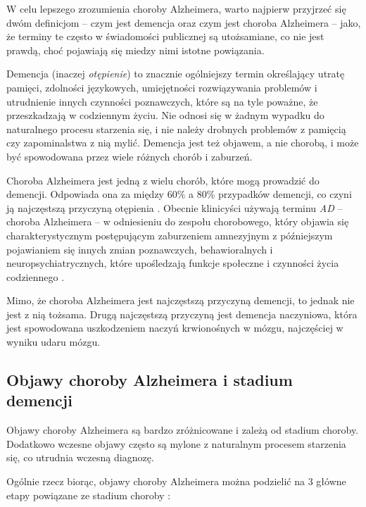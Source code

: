 W celu lepszego zrozumienia choroby Alzheimera, warto najpierw przyjrzeć się dwóm definicjom -- czym jest demencja oraz czym jest choroba Alzheimera -- jako, że terminy te często w świadomości publicznej są utożsamiane, co nie jest prawdą, choć pojawiają się miedzy nimi istotne powiązania.

Demencja (inaczej \emph{otępienie}) to znacznie ogólniejszy termin określający utratę pamięci, zdolności językowych, umiejętności rozwiązywania problemów i utrudnienie innych czynności poznawczych, które są na tyle poważne, że przeszkadzają w codziennym życiu.
Nie odnosi się w żadnym wypadku do naturalnego procesu starzenia się, i nie należy drobnych problemów z pamięcią czy zapominalstwa z nią mylić.
Demencja jest też objawem, a nie chorobą, i może być spowodowana przez wiele różnych chorób i zaburzeń.

Choroba Alzheimera jest jedną z wielu chorób, które mogą prowadzić do demencji.
Odpowiada ona za między 60\% a 80\% przypadków demencji, co czyni ją najczęstszą przyczyną otępienia \cite{what-is-alzheimers:2023}.
Obecnie klinicyści używają terminu \emph{AD} -- choroba Alzheimera -- w odniesieniu do zespołu chorobowego, który objawia się charakterystycznym postępującym zaburzeniem amnezyjnym z późniejszym pojawianiem się innych zmian poznawczych, behawioralnych i neuropsychiatrycznych, które upośledzają funkcje społeczne i czynności życia codziennego \cite{cummings2004alzheimer}.

Mimo, że choroba Alzheimera jest najczęstszą przyczyną demencji, to jednak nie jest z nią tożsama.
Drugą najczęstszą przyczyną jest demencja naczyniowa, która jest spowodowana uszkodzeniem naczyń krwionośnych w mózgu, najczęściej w wyniku udaru mózgu.


\subsection{Objawy choroby Alzheimera i stadium demencji}

Objawy choroby Alzheimera są bardzo zróżnicowane i zależą od stadium choroby.
Dodatkowo wczesne objawy często są mylone z naturalnym procesem starzenia się, co utrudnia wczesną diagnozę.

Ogólnie rzecz biorąc, objawy choroby Alzheimera można podzielić na 3 główne etapy powiązane ze stadium choroby \cite{alzheimers-symptoms:2021}:

